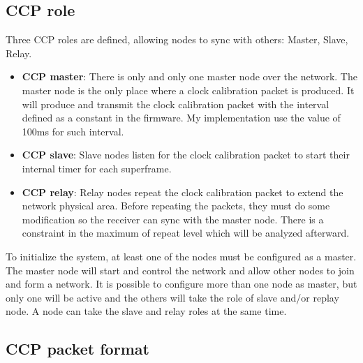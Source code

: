 \documentclass[\main/main.tex]{subfiles}
\begin{document}
\subsection{CCP role}
Three CCP roles are defined, allowing nodes to sync with others: Master, Slave, Relay.
\begin{itemize}
    \item \textbf{CCP master}: There is only and only one master node over the network. The master node is the only place where a clock calibration packet is produced. It will produce and transmit the clock calibration packet with the interval defined as a constant in the firmware. My implementation use the value of 100ms for such interval. 
    \item \textbf{CCP slave}: Slave nodes listen for the clock calibration packet to start their internal timer for each superframe.
    \item \textbf{CCP relay}: Relay nodes repeat the clock calibration packet to extend the network physical area. Before repeating the packets, they must do some modification so the receiver can sync with the  master node. There is a constraint in the maximum of repeat level which will be analyzed afterward.
\end{itemize}

To initialize the system, at least one of the nodes must be configured as a master. The master node will start and control the network and allow other nodes to join and form a network. It is possible to configure more than one node as master, but only one will be active and the others will take the role of slave and/or replay node. A node can take the slave and relay roles at the same time.

\subsection{CCP packet format}
\end{document}
